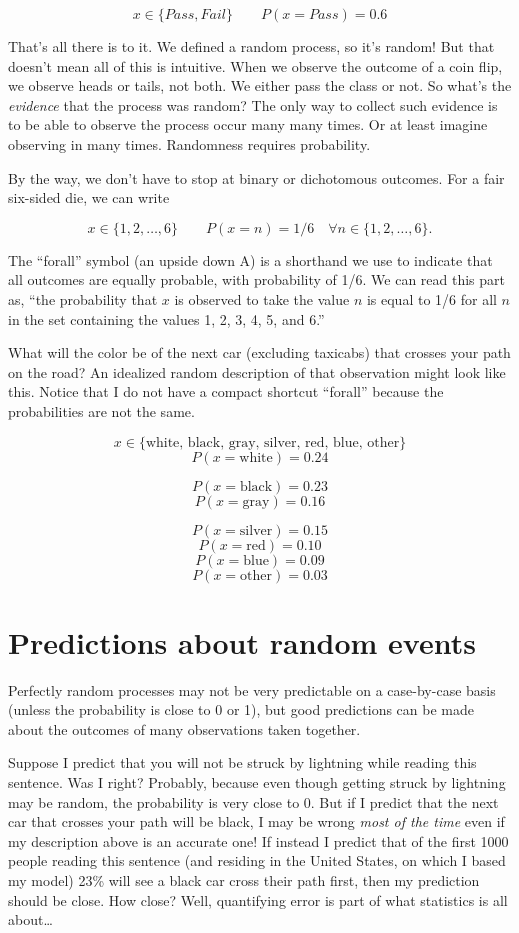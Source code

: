 \documentclass[openany]{book}
\begin{document}
\[ x \in \{Pass, Fail\} \qquad P(x=Pass) = 0.6\]

That's all there is to it. We defined a random process, so it's random! But that doesn't mean all of this is intuitive. When we observe the outcome of a coin flip, we observe heads or tails, not both. We either pass the class or not. So what's the \emph{evidence} that the process was random? The only way to collect such evidence is to be able to observe the process occur many many times. Or at least imagine observing in many times. Randomness requires probability.

By the way, we don't have to stop at binary or dichotomous outcomes. For a fair six-sided die, we can write

\[ x \in \{1, 2, \dots, 6\} \qquad P(x=n) = 1/6 \quad \forall n \in \{1, 2, \dots, 6\}. \]

The ``forall'' symbol (an upside down A) is a shorthand we use to indicate that all outcomes are equally probable, with probability of 1/6. We can read this part as, ``the probability that \(x\) is observed to take the value \(n\) is equal to 1/6 for all \(n\) in the set containing the values 1, 2, 3, 4, 5, and 6.''

What will the color be of the next car (excluding taxicabs) that crosses your path on the road? An idealized random description of that observation might look like this. Notice that I do not have a compact shortcut ``forall'' because the probabilities are not the same.

\[ x \in \{\mbox{white, black, gray, silver, red, blue, other}\} \]
\[ P(x=\mbox{white}) = 0.24 \]

\[ P(x=\mbox{black}) = 0.23 \]
\[P(x=\mbox{gray}) = 0.16 \]

\[P(x=\mbox{silver}) = 0.15 \]
\[P(x=\mbox{red}) = 0.10 \]
\[P(x=\mbox{blue}) = 0.09 \]
\[P(x=\mbox{other}) = 0.03 \]

\hypertarget{predictions-about-random-events}{%
\section{Predictions about random events}\label{predictions-about-random-events}}

Perfectly random processes may not be very predictable on a case-by-case basis (unless the probability is close to 0 or 1), but good predictions can be made about the outcomes of many observations taken together.

Suppose I predict that you will not be struck by lightning while reading this sentence. Was I right? Probably, because even though getting struck by lightning may be random, the probability is very close to 0. But if I predict that the next car that crosses your path will be black, I may be wrong \emph{most of the time} even if my description above is an accurate one! If instead I predict that of the first 1000 people reading this sentence (and residing in the United States, on which I based my model) 23\% will see a black car cross their path first, then my prediction should be close. How close? Well, quantifying error is part of what statistics is all about\ldots{}
\end{document}

